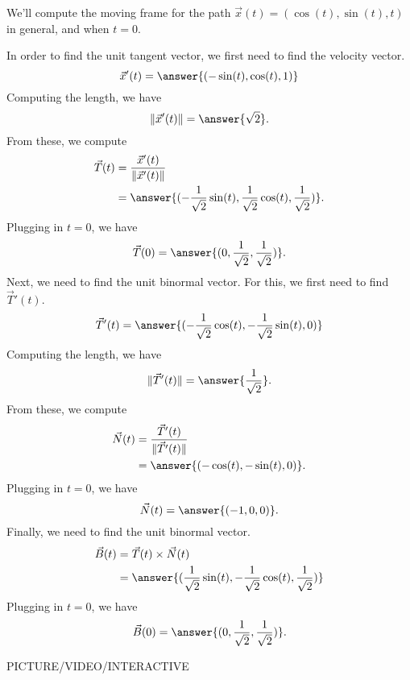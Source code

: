 \documentclass{ximera}
\begin{document}
\begin{example}
We'll compute the moving frame for the path $\vec{x}(t) = (\cos(t),\sin(t), t)$ in general, and when $t = 0$.

In order to find the unit tangent vector, we first need to find the velocity vector.
\[
\vec{x}'(t) = \answer{(-\sin(t), \cos(t), 1)}
\]
Computing the length, we have
\[
\|\vec{x}'(t)\| = \answer{\sqrt{2}}.
\]
From these, we compute
\begin{align*}
\vec{T}(t) &= \dfrac{\vec{x}'(t)}{\|\vec{x}'(t)\|}\\
&= \answer{(-\frac{1}{\sqrt{2}}\sin(t), \frac{1}{\sqrt{2}}\cos(t), \frac{1}{\sqrt{2}})}.
\end{align*}
Plugging in $t=0$, we have
\[
\vec{T}(0) = \answer{(0,\frac{1}{\sqrt{2}},\frac{1}{\sqrt{2}})}.
\]
Next, we need to find the unit binormal vector. For this, we first need to find $\vec{T}'(t)$.
\[
\vec{T}'(t) = \answer{(-\frac{1}{\sqrt{2}}\cos(t), -\frac{1}{\sqrt{2}}\sin(t), 0)}
\]
Computing the length, we have
\[
\|\vec{T}'(t)\| = \answer{\frac{1}{\sqrt{2}}}.
\]
From these, we compute
\begin{align*}
\vec{N}(t) &= \dfrac{\vec{T}'(t)}{\|\vec{T}'(t)\|}\\
&= \answer{(-\cos(t), -\sin(t),0)}.
\end{align*}
Plugging in $t=0$, we have
\[
\vec{N}(t) = \answer{(-1,0,0)}.
\]
Finally, we need to find the unit binormal vector.
\begin{align*}
\vec{B}(t) &= \vec{T}(t)\times\vec{N}(t)\\
&= \answer{(\frac{1}{\sqrt{2}}\sin(t), -\frac{1}{\sqrt{2}}\cos(t), \frac{1}{\sqrt{2}})}
\end{align*}
Plugging in $t=0$, we have
\[
\vec{B}(0) = \answer{(0, \frac{1}{\sqrt{2}}, \frac{1}{\sqrt{2}})}.
\]

PICTURE/VIDEO/INTERACTIVE
\end{example}
\end{document}
